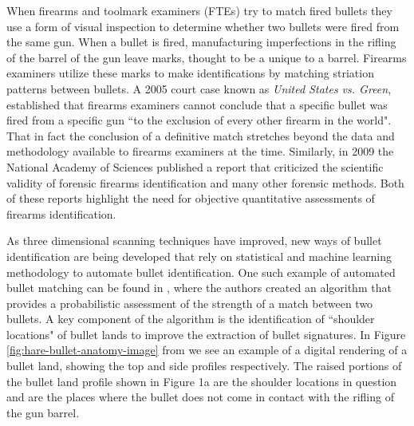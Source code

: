\documentclass[12pt]{article}\usepackage[]{graphicx}\usepackage[]{color}
\theoremstyle{nonumberplain}
\begin{document}
When firearms and toolmark examiners (FTEs) try to match fired bullets they use a form of visual inspection to determine whether two bullets were fired from the same gun. When a bullet is  fired, manufacturing imperfections in the rifling of the barrel of the gun  leave marks, thought to be a unique to a barrel. Firearms examiners utilize these marks to make identifications by matching striation patterns between bullets. A 2005 court case known as \textit{United States vs. Green}, established that firearms examiners cannot conclude that a specific bullet was fired from a specific gun ``to the exclusion of every other firearm in the world". That in fact the conclusion of a definitive match stretches beyond the data and methodology available to firearms examiners at the time.  Similarly, in 2009 the National Academy of Sciences published a report that criticized the scientific validity of forensic firearms identification and many other forensic methods. Both of these reports highlight the need for objective quantitative assessments of firearms identification. 

As three dimensional scanning techniques have improved, new ways of bullet identification are being developed that rely on  statistical and machine learning methodology to automate bullet identification. One such example of automated bullet matching can be found in \cite{hare2017}, where the authors created an algorithm  that provides a probabilistic assessment of the strength of a match between two bullets. A key component of the algorithm  is the identification of ``shoulder locations" of bullet lands to improve the extraction of bullet signatures. In Figure \ref{fig:hare-bullet-anatomy-image} from \cite{hare2017} we see an example of a digital rendering of a bullet land, showing the top and side profiles respectively. The raised portions of the bullet land profile shown in Figure 1a are the shoulder locations in question and are the places where the bullet does not come in contact with the rifling of the gun barrel. 
\end{document}
